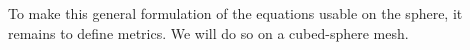 \documentclass{report}
\begin{document}
To make this general formulation of the equations usable on the sphere, it remains to define metrics. We will do so on a cubed-sphere mesh.





\end{document}

